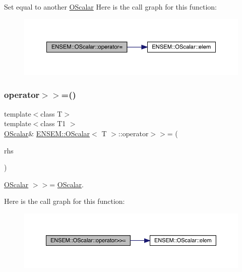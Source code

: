Set equal to another \mbox{\hyperlink{classENSEM_1_1OScalar}{O\+Scalar}} Here is the call graph for this function\+:
\nopagebreak
\begin{figure}[H]
\begin{center}
\leavevmode
\includegraphics[width=350pt]{da/d80/classENSEM_1_1OScalar_aa6400023b45eed547bcb84c395fa1520_cgraph}
\end{center}
\end{figure}
\mbox{\label{classENSEM_1_1OScalar_a38ab5a0779184c6ca5a1b3211e2e38ca}} 
\subsubsection{\texorpdfstring{operator$>$$>$=()}{operator>>=()}\hspace{0.1cm}{\footnotesize\ttfamily [1/2]}}
{\footnotesize\ttfamily template$<$class T$>$ \\
template$<$class T1 $>$ \\
\mbox{\hyperlink{classENSEM_1_1OScalar}{O\+Scalar}}\& \mbox{\hyperlink{classENSEM_1_1OScalar}{E\+N\+S\+E\+M\+::\+O\+Scalar}}$<$ T $>$\+::operator$>$$>$= (\begin{DoxyParamCaption}\item[{const \mbox{\hyperlink{classENSEM_1_1OScalar}{O\+Scalar}}$<$ T1 $>$ \&}]{rhs }\end{DoxyParamCaption})\hspace{0.3cm}{\ttfamily [inline]}}



\mbox{\hyperlink{classENSEM_1_1OScalar}{O\+Scalar}} $>$$>$= \mbox{\hyperlink{classENSEM_1_1OScalar}{O\+Scalar}}. 

Here is the call graph for this function\+:
\nopagebreak
\begin{figure}[H]
\begin{center}
\leavevmode
\includegraphics[width=350pt]{da/d80/classENSEM_1_1OScalar_a38ab5a0779184c6ca5a1b3211e2e38ca_cgraph}
\end{center}
\end{figure}
\mbox{\label{classENSEM_1_1OScalar_a38ab5a0779184c6ca5a1b3211e2e38ca}} 
